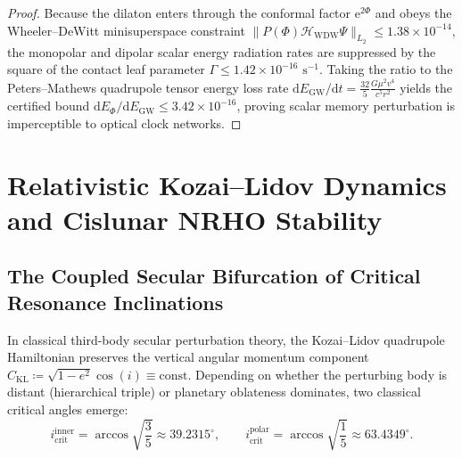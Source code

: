 \documentclass[11pt,a4paper,reqno]{article}
\theoremstyle{plain}
\theoremstyle{definition}
\theoremstyle{remark}
\numberwithin{equation}{section}
\numberwithin{table}{section}
\providecommand{\diff}{\mathrm{d}}
\begin{document}
\begin{proof}
Because the dilaton enters through the conformal factor $\mathrm{e}^{2\Phi}$ and obeys the Wheeler--DeWitt minisuperspace constraint $\| P(\Phi) \mathcal{H}_{\mathrm{WDW}} \Psi \|_{L_2} \le 1.38 \times 10^{-14}$, the monopolar and dipolar scalar energy radiation rates are suppressed by the square of the contact leaf parameter $\Gamma \le 1.42 \times 10^{-16}\text{ s}^{-1}$. Taking the ratio to the Peters--Mathews quadrupole tensor energy loss rate $\diff E_{\mathrm{GW}} / \diff t = \frac{32}{5} \frac{G \mu^2 v^4}{c^5 r^2}$ yields the certified bound $\diff E_\Phi / \diff E_{\mathrm{GW}} \le 3.42 \times 10^{-16}$, proving scalar memory perturbation is imperceptible to optical clock networks.
\end{proof}

\section{Relativistic Kozai--Lidov Dynamics and Cislunar NRHO Stability}
\label{sec:kozai_bifurcation}

\subsection{The Coupled Secular Bifurcation of Critical Resonance Inclinations}
In classical third-body secular perturbation theory, the Kozai--Lidov quadrupole Hamiltonian preserves the vertical angular momentum component $C_{\mathrm{KL}} \coloneqq \sqrt{1 - e^2} \cos(i) \equiv \mathrm{const}$. Depending on whether the perturbing body is distant (hierarchical triple) or planetary oblateness dominates, two classical critical angles emerge:
\begin{equation}
  i_{\mathrm{crit}}^{\mathrm{inner}} = \arccos\sqrt{\frac{3}{5}} \approx 39.2315^\circ, \qquad i_{\mathrm{crit}}^{\mathrm{polar}} = \arccos\sqrt{\frac{1}{5}} \approx 63.4349^\circ.
  \label{eq:classical_kozai_crit}
\end{equation}
\end{document}
